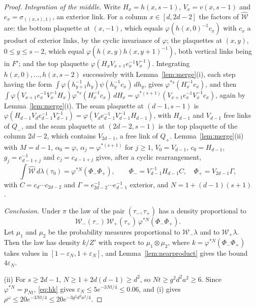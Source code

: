 \begin{proof}
\emph{Integration of the middle.} Write $H_x=h(x,s-1)$, $V_x=v(x,s-1)$ and
$e_x=\sigma_{((x,s),1)}$, an exterior link. For a column $x\in[d,2d-2]$ the
factors of $\widehat{\mathcal W}$ are: the bottom plaquette at $(x,-1)$, which
equals $\varphi(h(x,0)^{-1}c_x)$ with $c_x$ a product of exterior links, by the
cyclic invariance of $\varphi$; the plaquettes at $(x,y)$, $0\le y\le s-2$,
which equal $\varphi(h(x,y)h(x,y+1)^{-1})$, both vertical links being in $F'$;
and the top plaquette $\varphi(H_xV_{x+1}e_x^{-1}V_x^{-1})$. Integrating
$h(x,0),\dots,h(x,s-2)$ successively with Lemma~\ref{lem:merge}(i), each step
having the form $\int\varphi(h_{y+1}^{-1}h_y)\psi(h_y^{-1}c_x)\,dh_y$, gives
$\varphi^{*s}(H_x^{-1}c_x)$, and then $\int\varphi(V_{x+1}e_x^{-1}V_x^{-1}H_x)
\varphi^{*s}(H_x^{-1}c_x)\,dH_x=\varphi^{*(s+1)}(V_{x+1}e_x^{-1}V_x^{-1}c_x)$,
again by Lemma~\ref{lem:merge}(i). The seam plaquette at $(d-1,s-1)$ is
$\varphi(H_{d-1}V_de_{d-1}^{-1}V_{d-1}^{-1})=\varphi(V_de_{d-1}^{-1}V_{d-1}^{-1}
H_{d-1})$, with $H_{d-1}$ and $V_{d-1}$ free links of $Q_-$, and the seam
plaquette at $(2d-2,s-1)$ is the top plaquette of the column $2d-2$, which
contains $V_{2d-1}$, a free link of $Q_+$. Lemma~\ref{lem:merge}(ii) with
$M=d-1$, $\alpha_0=\varphi$, $\alpha_j=\varphi^{*(s+1)}$ for $j\ge1$,
$V_0=V_{d-1}$, $c_0=H_{d-1}$, $g_j=e^{-1}_{d-1+j}$ and $c_j=c_{d-1+j}$ gives,
after a cyclic rearrangement,
\[
\int\widehat{\mathcal W}\,d\lambda(\tau_0)=\varphi^{*N}(\Phi_-\Phi_+),\qquad
\Phi_-=V_{d-1}^{-1}H_{d-1}C,\quad\Phi_+=V_{2d-1}\Gamma,
\]
with $C=c_d\cdots c_{2d-2}$ and $\Gamma=e_{2d-2}^{-1}\cdots e_{d-1}^{-1}$
exterior, and $N=1+(d-1)(s+1)$.

\emph{Conclusion.} Under $\pi$ the law of the pair $(\tau_-,\tau_+)$ has a
density proportional to
\[
\mathcal W_-(\tau_-)\,\mathcal W_+(\tau_+)\,\varphi^{*N}(\Phi_-\Phi_+).
\]
Let $\mu_1$ and $\mu_2$ be the probability measures proportional to
$\mathcal W_-\lambda$ and to $\mathcal W_+\lambda$. Then the law has density
$k/Z'$ with respect to $\mu_1\otimes\mu_2$, where
$k=\varphi^{*N}(\Phi_-\Phi_+)$ takes values in
$[1-\varepsilon_N,1+\varepsilon_N]$, and Lemma~\ref{lem:nearproduct} gives the
bound $4\varepsilon_N$.

(ii) For $s\ge2d-1$, $N\ge1+2d(d-1)\ge d^2$, so $Nt\ge g^2d^2a^2\ge6$. Since
$\varphi^{*N}=p_{Nt}$, \eqref{eq:hk} gives $\varepsilon_N\le5e^{-3Nt/4}\le0.06$,
and (i) gives $\rho^\omega\le20e^{-3Nt/4}\le20e^{-3g^2d^2a^2/4}$.
\end{proof}

